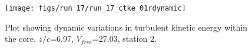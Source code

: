 \begin{figure}[H]
\centering
\texttt{[image: figs/run\_17/run\_17\_ctke\_01rdynamic]}
\caption{Plot showing dynamic variations in turbulent kinetic energy within the core. $z/c$=6.97, $V_{free}$=27.03, station 2.}
\label{fig:run_17_ctke_01rdynamic}
\end{figure}


